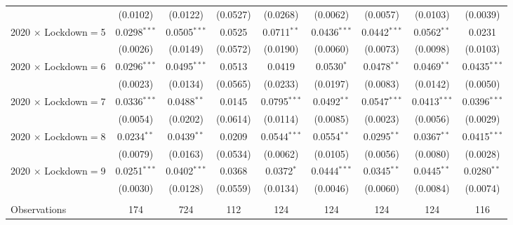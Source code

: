 \begin{tabular}{lcccccccc}
                                & (0.0102)       & (0.0122)       & (0.0527)      & (0.0268)       & (0.0062)       & (0.0057)       & (0.0103)       & (0.0039)\\
   2020 $\times$ Lockdown$=$5  & 0.0298$^{***}$ & 0.0505$^{***}$ & 0.0525        & 0.0711$^{**}$  & 0.0436$^{***}$ & 0.0442$^{***}$ & 0.0562$^{**}$  & 0.0231\\
                                & (0.0026)       & (0.0149)       & (0.0572)      & (0.0190)       & (0.0060)       & (0.0073)       & (0.0098)       & (0.0103)\\
   2020 $\times$ Lockdown$=$6  & 0.0296$^{***}$ & 0.0495$^{***}$ & 0.0513        & 0.0419         & 0.0530$^{*}$   & 0.0478$^{**}$  & 0.0469$^{**}$  & 0.0435$^{***}$\\
                                & (0.0023)       & (0.0134)       & (0.0565)      & (0.0233)       & (0.0197)       & (0.0083)       & (0.0142)       & (0.0050)\\
   2020 $\times$ Lockdown$=$7  & 0.0336$^{***}$ & 0.0488$^{**}$  & 0.0145        & 0.0795$^{***}$ & 0.0492$^{**}$  & 0.0547$^{***}$ & 0.0413$^{***}$ & 0.0396$^{***}$\\
                                & (0.0054)       & (0.0202)       & (0.0614)      & (0.0114)       & (0.0085)       & (0.0023)       & (0.0056)       & (0.0029)\\
   2020 $\times$ Lockdown$=$8  & 0.0234$^{**}$  & 0.0439$^{**}$  & 0.0209        & 0.0544$^{***}$ & 0.0554$^{**}$  & 0.0295$^{**}$  & 0.0367$^{**}$  & 0.0415$^{***}$\\
                                & (0.0079)       & (0.0163)       & (0.0534)      & (0.0062)       & (0.0105)       & (0.0056)       & (0.0080)       & (0.0028)\\
   2020 $\times$ Lockdown$=$9  & 0.0251$^{***}$ & 0.0402$^{***}$ & 0.0368        & 0.0372$^{*}$   & 0.0444$^{***}$ & 0.0345$^{**}$  & 0.0445$^{**}$  & 0.0280$^{**}$\\
                                & (0.0030)       & (0.0128)       & (0.0559)      & (0.0134)       & (0.0046)       & (0.0060)       & (0.0084)       & (0.0074)\\
                                &                &                &               &                &                &                &                &  \\
   Observations                 & 174            & 724            & 112           & 124            & 124            & 124            & 124            & 116\\

\end{tabular}
